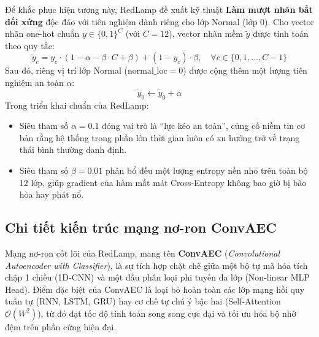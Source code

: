 \documentclass[11pt,journal,onecolumn]{IEEEtran}
\begin{document}
Để khắc phục hiện tượng này, RedLamp đề xuất kỹ thuật \textbf{Làm mượt nhãn bất đối xứng} độc đáo với tiên nghiệm dành riêng cho lớp Normal (lớp 0).
Cho vector nhãn one-hot chuẩn $y \in \{0, 1\}^C$ (với $C = 12$), vector nhãn mềm $\tilde{y}$ được tính toán theo quy tắc:
\begin{equation}
\label{eq:label_smoothing}
\tilde{y}_c = y_c \cdot (1 - \alpha - \beta \cdot C + \beta) + (1 - y_c) \cdot \beta, \quad \forall c \in \{0, 1, \dots, C-1\}
\end{equation}
Sau đó, riêng vị trí lớp Normal ($\text{normal\_loc} = 0$) được cộng thêm một lượng tiên nghiệm an toàn $\alpha$:
\begin{equation}
\tilde{y}_0 \leftarrow \tilde{y}_0 + \alpha
\end{equation}
Trong triển khai chuẩn của RedLamp:
\begin{itemize}
    \item Siêu tham số $\alpha = 0.1$ đóng vai trò là ``lực kéo an toàn'', củng cố niềm tin cơ bản rằng hệ thống trong phần lớn thời gian luôn có xu hướng trở về trạng thái bình thường danh định.
    \item Siêu tham số $\beta = 0.01$ phân bổ đều một lượng entropy nền nhỏ trên toàn bộ 12 lớp, giúp gradient của hàm mất mát Cross-Entropy không bao giờ bị bão hòa hay phát nổ.
\end{itemize}

\subsection{Chi tiết kiến trúc mạng nơ-ron ConvAEC}
\label{subsec:convaec_details}
Mạng nơ-ron cốt lõi của RedLamp, mang tên \textbf{ConvAEC} (\textit{Convolutional Autoencoder with Classifier}), là sự tích hợp chặt chẽ giữa một bộ tự mã hóa tích chập 1 chiều (1D-CNN) và một đầu phân loại phi tuyến đa lớp (Non-linear MLP Head). Điểm đặc biệt của ConvAEC là loại bỏ hoàn toàn các lớp mạng hồi quy tuần tự (RNN, LSTM, GRU) hay cơ chế tự chú ý bậc hai (Self-Attention $\mathcal{O}(W^2)$), từ đó đạt tốc độ tính toán song song cực đại và tối ưu hóa bộ nhớ đệm trên phần cứng hiện đại.
\end{document}
